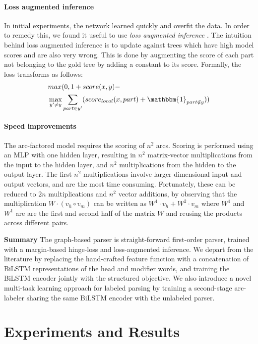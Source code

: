 \documentclass[11pt]{article}
\begin{document}
\paragraph{Loss augmented inference}
In initial experiments, the network learned quickly and overfit the data.
In order to remedy this, we found it useful to use \emph{loss augmented
inference} \cite{taskar2005learning}. The intuition behind loss augmented inference is to update against trees which
have high model scores and are also very wrong. This is done by augmenting the
score of each part not belonging to the gold tree by adding a constant to its score.
Formally, the loss transforms as follows:
\begin{align*}
&max(0, 1 + score(x,y) - \\
&\max_{y' \neq y} {\sum_{part \in y'} ( score_{local}(x,part) + \mathbbm{1}_{part \not \in y} ) } )
\end{align*}

\paragraph{Speed improvements}
The arc-factored model requires the scoring of $n^2$ arcs. Scoring is performed
using an MLP with one hidden layer, resulting in $n^2$ matrix-vector multiplications
from the input to the hidden layer, and $n^2$ multiplications from the hidden to
the output layer. The first $n^2$ multiplications involve larger dimensional
input and output vectors, and are the most time consuming. Fortunately, these
can be reduced to $2n$ multiplications and $n^2$ vector additions,
by observing that the multiplication
$W \cdot (v_h \circ v_m)$ can be written as $W^1 \cdot v_h + W^2 \cdot v_m$ where
$W^1$ and $W^1$ are are the first and second half of the matrix $W$ and reusing
the products across different pairs.

\noindent\textbf{Summary}
The graph-based parser is straight-forward first-order parser, trained with a
margin-based hinge-loss and loss-augmented inference. 
We depart from the literature by replacing the hand-crafted feature function
with a concatenation of \mbox{BiLSTM} representations of the head and modifier words,
and training the \mbox{BiLSTM} encoder jointly with the structured objective.
We also introduce a novel multi-task learning approach for labeled parsing by training a second-stage arc-labeler sharing the same \mbox{BiLSTM} encoder with the unlabeled
parser.



\section{Experiments and Results}
\label{sec:results}
\end{document}
